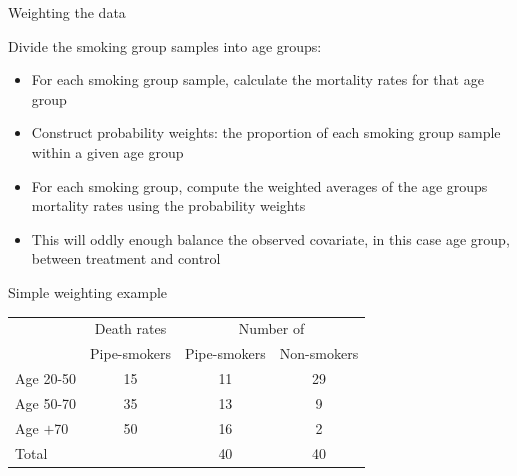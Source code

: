 \documentclass{beamer}
\begin{document}
\begin{frame}{Weighting the data}

  Divide the smoking group samples into age groups:
  \begin{itemize}
		\item For each smoking group sample, calculate the mortality rates for that age group
		\item Construct probability weights: the proportion of each smoking group sample within a given age group
		\item For each smoking group, compute the weighted averages of the age groups mortality rates using the probability weights
		\item This will oddly enough balance the observed covariate, in this case age group, between treatment and control
  \end{itemize}

\end{frame}


\begin{frame}{Simple weighting example}
	


	\begin{table}\centering
		\begin{center}
		\begin{tabular}{lccc}
		\hline \hline
		\multicolumn{1}{l}{}&
		\multicolumn{1}{c}{Death rates}&
		\multicolumn{2}{c}{Number of}\\
		\multicolumn{1}{l}{}&
		\multicolumn{1}{c}{Pipe-smokers}&
		\multicolumn{1}{c}{Pipe-smokers}&
		\multicolumn{1}{c}{Non-smokers}\\
		\hline
		Age 20-50 & 15 & 11 & 29 \\
		Age 50-70 & 35 & 13 & 9 \\
		Age $+$70 & 50 & 16 & 2 \\
		Total & & 40 & 40 \\		
		\hline
		\end{tabular}
		\end{center}
	\end{table}
	
	\begin{flalign*}
    \\
     \\
     \\ 
    \\
	\end{flalign*}

\end{frame}
\end{document}
